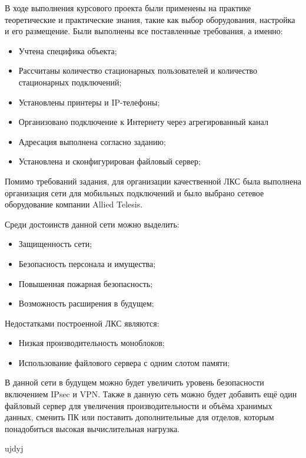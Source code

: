 \label{sec:outro}

В ходе выполнения курсового проекта были применены на практике теоретические и практические знания, такие как
выбор оборудования, настройка и его размещение.
Были выполнены все поставленные требования, а именно:

\begin{itemize}
  \item Учтена специфика объекта;
  \item Рассчитаны количество стационарных пользователей и количество стационарных подключений;
  \item Установлены принтеры и IP-телефоны;
  \item Организовано подключение к Интернету через агрегированный канал
  \item Адресация выполнена согласно заданию;
  \item Установлена и сконфигурирован файловый сервер;
\end{itemize}

Помимо требований задания, для организации качественной ЛКС была выполнена
организация сети для мобильных подключений и было выбрано сетевое оборудование
компании Allied Telesis.

Среди достоинств данной сети можно выделить:

\begin{itemize}
  \item Защищенность сети;
  \item Безопасность персонала и имущества;
  \item Повышенная пожарная безопасность;
  \item Возможность расширения в будущем;
\end{itemize}

Недостатками построенной ЛКС являются:

\begin{itemize}
  \item Низкая производительность моноблоков;
  \item Использование файлового сервера с одним слотом памяти;
\end{itemize}

В данной сети в будущем можно будет увеличить уровень безопасности включением IPsec и VPN.
Также в данную сеть можно будет добавить ещё один файловый сервер
для увеличения производительности и объёма хранимых данных,
сменить ПК или поставить дополнительные для отделов, которым понадобиться высокая вычислительная нагрузка.

\newpage

ujdyj

